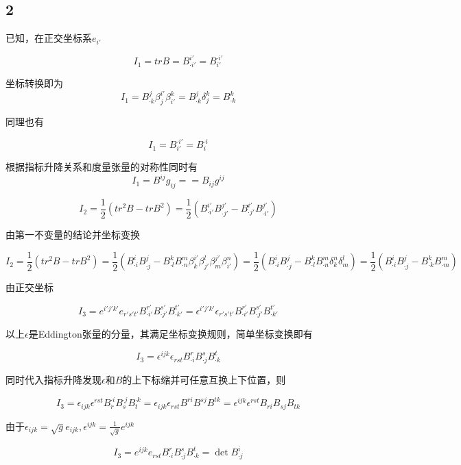 \documentclass[UTF8,zihao=5]{ctexart}
\begin{document}
\subsection*{2}

已知，在正交坐标系$e_{i'}$

$$
I_1=trB=B^{i'}_{\cdot i'}=B^{\cdot i'}_{i'}
$$

坐标转换即为
$$
I_1=B^{j}_{\cdot k}\beta_{j}^{i'}\beta_{i'}^{k}
=B^{j}_{\cdot k}\delta_{j}^{k}=B^{k}_{\cdot k}
$$

同理也有

$$
I_1=B^{\cdot i'}_{i'}=B^{\cdot i}_{i}
$$

根据指标升降关系和度量张量的对称性同时有
$$
I_1=B^{ij}g_{ij}==B_{ij}g^{ij}
$$



$$
I_2=\frac{1}{2}(tr^2B-trB^2)=
\frac{1}{2}\left(
    B^{i'}_{\cdot i'}B^{j'}_{\cdot j'}
    -B^{i'}_{\cdot j'}B^{j'}_{\cdot i'}
\right)
$$

由第一不变量的结论并坐标变换

$$
I_2=\frac{1}{2}(tr^2B-trB^2)=
\frac{1}{2}\left(
    B^{i}_{\cdot i}B^{j}_{\cdot j}
    -B^{k}_{\cdot l}B^{m}_{\cdot n}
    \beta_{k}^{i'}\beta_{j'}^{l}
    \beta_{m}^{j'}\beta^{n}_{i'}
\right)
=
\frac{1}{2}\left(
    B^{i}_{\cdot i}B^{j}_{\cdot j}
    -B^{k}_{\cdot l}B^{m}_{\cdot n}
    \delta_{k}^{n}
    \delta_{m}^{l}
\right)
=
\frac{1}{2}\left(
    B^{i}_{\cdot i}B^{j}_{\cdot j}
    -B^{k}_{\cdot k}B^{m}_{\cdot m}
\right)
$$

由正交坐标

$$
I_3=e^{i'j'k'}e_{r's't'}B^{r'}_{\cdot i'}B^{s'}_{\cdot j'}B^{t'}_{\cdot k'}
=\epsilon^{i'j'k'}\epsilon_{r's't'}B^{r'}_{\cdot i'}B^{s'}_{\cdot j'}B^{t'}_{\cdot k'}
$$

以上$\epsilon$是Eddington张量的分量，其满足坐标变换规则，简单坐标变换即有

$$
I_3
=\epsilon^{ijk}\epsilon_{rst}B^{r}_{\cdot i}B^{s}_{\cdot j}B^{t}_{\cdot k}
$$

同时代入指标升降发现$\epsilon$和$B$的上下标缩并可任意互换上下位置，则

$$
I_3
=\epsilon_{ijk}\epsilon^{rst}B_{r}^{\cdot i}B_{s}^{\cdot j}B_{t}^{\cdot k}
=\epsilon_{ijk}\epsilon_{rst}B^{ri}B^{sj}B^{tk}
=\epsilon^{ijk}\epsilon^{rst}B_{ri}B_{sj}B_{tk}
$$

由于$\epsilon_{ijk}=\sqrt{g}e_{ijk},\epsilon^{ijk}=\frac{1}{\sqrt{g}}e^{ijk}$

$$
I_3
=e^{ijk}e_{rst}B^{r}_{\cdot i}B^{s}_{\cdot j}B^{t}_{\cdot k}=\det{B^i_{\cdot j}}
$$
\end{document}
